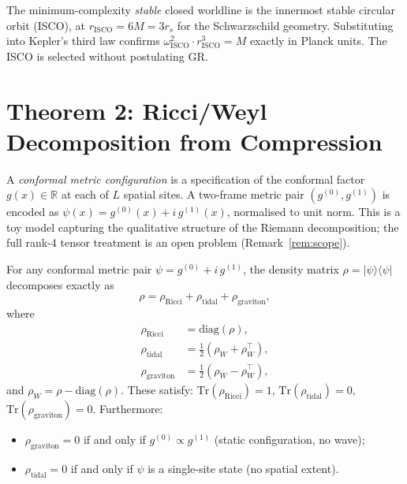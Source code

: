 \documentclass[11pt]{article}
\begin{document}
\begin{corollary}
The minimum-complexity \emph{stable} closed worldline is the innermost
stable circular orbit (ISCO), at $r_{\mathrm{ISCO}} = 6M = 3r_s$ for
the Schwarzschild geometry.
Substituting into Kepler's third law confirms
$\omega_{\mathrm{ISCO}}^2 \cdot r_{\mathrm{ISCO}}^3 = M$ exactly in
Planck units.
The ISCO is selected without postulating GR.
\end{corollary}

\section{Theorem 2: Ricci/Weyl Decomposition from Compression}
\label{sec:decomp}

A \emph{conformal metric configuration} is a specification of the
conformal factor $g(x) \in \mathbb{R}$ at each of $L$ spatial sites.
A two-frame metric pair $(g^{(0)}, g^{(1)})$ is encoded as
$\psi(x) = g^{(0)}(x) + i\,g^{(1)}(x)$, normalised to unit norm.
This is a toy model capturing the qualitative structure of the
Riemann decomposition; the full rank-4 tensor treatment is an open
problem (Remark~\ref{rem:scope}).

\begin{theorem}
\label{thm:decomp}
For any conformal metric pair $\psi = g^{(0)} + i\,g^{(1)}$, the
density matrix $\rho = |\psi\rangle\langle\psi|$ decomposes exactly as
\[
  \rho = \rho_{\mathrm{Ricci}} + \rho_{\mathrm{tidal}} +
  \rho_{\mathrm{graviton}},
\]
where
\begin{align*}
  \rho_{\mathrm{Ricci}}   &= \mathrm{diag}(\rho), \\
  \rho_{\mathrm{tidal}}   &= \tfrac{1}{2}(\rho_W + \rho_W^\top), \\
  \rho_{\mathrm{graviton}}&= \tfrac{1}{2}(\rho_W - \rho_W^\top),
\end{align*}
and $\rho_W = \rho - \mathrm{diag}(\rho)$.
These satisfy:
$\mathrm{Tr}(\rho_{\mathrm{Ricci}}) = 1$,
$\mathrm{Tr}(\rho_{\mathrm{tidal}}) = 0$,
$\mathrm{Tr}(\rho_{\mathrm{graviton}}) = 0$.
Furthermore:
\begin{itemize}
  \item $\rho_{\mathrm{graviton}} = 0$ if and only if
    $g^{(0)} \propto g^{(1)}$ (static configuration, no wave);
  \item $\rho_{\mathrm{tidal}} = 0$ if and only if $\psi$ is a
    single-site state (no spatial extent).
\end{itemize}
\end{theorem}
\end{document}

